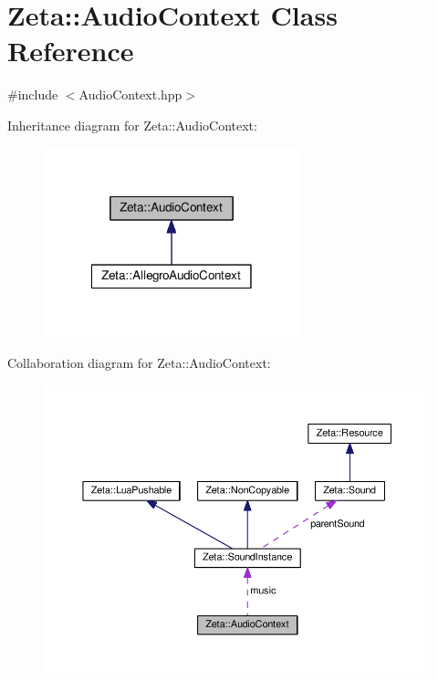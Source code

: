 \hypertarget{classZeta_1_1AudioContext}{\section{Zeta\+:\+:Audio\+Context Class Reference}
\label{classZeta_1_1AudioContext}
}


{\ttfamily \#include $<$Audio\+Context.\+hpp$>$}



Inheritance diagram for Zeta\+:\+:Audio\+Context\+:\nopagebreak
\begin{figure}[H]
\begin{center}
\leavevmode
\includegraphics[width=210pt]{classZeta_1_1AudioContext__inherit__graph}
\end{center}
\end{figure}


Collaboration diagram for Zeta\+:\+:Audio\+Context\+:\nopagebreak
\begin{figure}[H]
\begin{center}
\leavevmode
\includegraphics[width=350pt]{classZeta_1_1AudioContext__coll__graph}
\end{center}
\end{figure}
